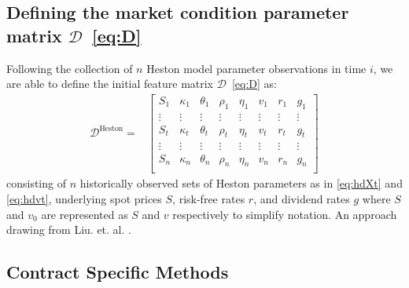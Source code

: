 \documentclass[11pt]{article}
\newcommand{\D}{\mathcal{D}}
\begin{document}
	\subsection{Defining the market condition parameter matrix $\D$~\eqref{eq:D}}
	\label{sections:HDt}
	Following the collection of $n$ Heston \cite{heston_1993_a} model parameter observations in time $i$, we are able to define the initial feature matrix $\D$~\eqref{eq:D} as:
	\begin{align}
		\D^{\text{Heston}} = &
		\begin{bmatrix} 
			S_{1} & \kappa_1 & \theta_1 & \rho_1 & \eta_1 & v_{1} & r_1 & g_1 \\
			\vdots & \vdots & \vdots & \vdots & \vdots & \vdots & \vdots & \vdots \\
			S_{t} & \kappa_{t} & \theta_{t} & \rho_{t} & \eta_{t} & v_{t} & r_{t} & g_{t} \\
			\vdots & \vdots & \vdots & \vdots & \vdots & \vdots & \vdots & \vdots \\
			S_{n} & \kappa_n & \theta_n & \rho_n & \eta_n & v_{n} & r_n & g_n \\
		\end{bmatrix} \label{eq:HD}
	\end{align}
	consisting of $n$ historically observed sets of Heston \cite{heston_1993_a} parameters as in \eqref{eq:hdXt} and \eqref{eq:hdvt}, underlying spot prices $S$, risk-free rates $r$, and dividend rates $g$ where $S$ and $v_0$ are represented as $S$ and $v$ respectively to simplify notation. An approach drawing from Liu. et. al. \cite{liu_2019_pricing}.
	\subsection{Contract Specific Methods}
		\label{sections:contractMethods}
\end{document}
